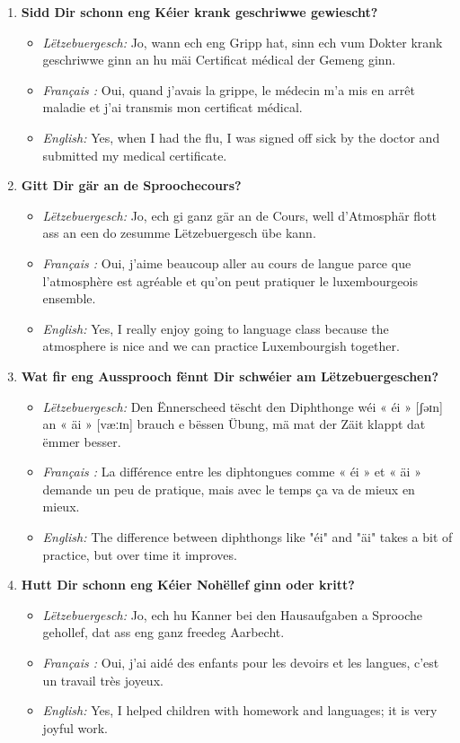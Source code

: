 \begin{enumerate}
    \item \textbf{Sidd Dir schonn eng Kéier krank geschriwwe gewiescht?}
    \begin{itemize}
        \item \textit{Lëtzebuergesch:} Jo, wann ech eng Gripp hat, sinn ech vum Dokter krank geschriwwe ginn an hu mäi Certificat médical der Gemeng ginn.
        \item \textit{Français :} Oui, quand j'avais la grippe, le médecin m'a mis en arrêt maladie et j'ai transmis mon certificat médical.
        \item \textit{English:} Yes, when I had the flu, I was signed off sick by the doctor and submitted my medical certificate.
    \end{itemize}

    \item \textbf{Gitt Dir gär an de Sproochecours?}
    \begin{itemize}
        \item \textit{Lëtzebuergesch:} Jo, ech gi ganz gär an de Cours, well d'Atmosphär flott ass an een do zesumme Lëtzebuergesch übe kann.
        \item \textit{Français :} Oui, j'aime beaucoup aller au cours de langue parce que l'atmosphère est agréable et qu'on peut pratiquer le luxembourgeois ensemble.
        \item \textit{English:} Yes, I really enjoy going to language class because the atmosphere is nice and we can practice Luxembourgish together.
    \end{itemize}

    \item \textbf{Wat fir eng Aussprooch fënnt Dir schwéier am Lëtzebuergeschen?}
    \begin{itemize}
        \item \textit{Lëtzebuergesch:} Den Ënnerscheed tëscht den Diphthonge wéi « éi » [ʃəɪn] an « äi » [væːɪn] brauch e bëssen Übung, mä mat der Zäit klappt dat ëmmer besser.
        \item \textit{Français :} La différence entre les diphtongues comme « éi » et « äi » demande un peu de pratique, mais avec le temps ça va de mieux en mieux.
        \item \textit{English:} The difference between diphthongs like "éi" and "äi" takes a bit of practice, but over time it improves.
    \end{itemize}

    \item \textbf{Hutt Dir schonn eng Kéier Nohëllef ginn oder kritt?}
    \begin{itemize}
        \item \textit{Lëtzebuergesch:} Jo, ech hu Kanner bei den Hausaufgaben a Sprooche gehollef, dat ass eng ganz freedeg Aarbecht.
        \item \textit{Français :} Oui, j'ai aidé des enfants pour les devoirs et les langues, c'est un travail très joyeux.
        \item \textit{English:} Yes, I helped children with homework and languages; it is very joyful work.
    \end{itemize}


\end{enumerate}

